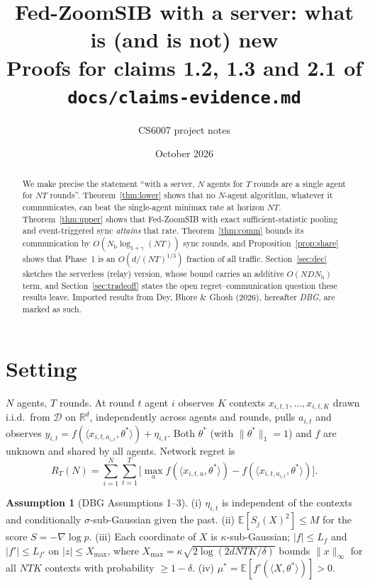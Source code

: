 \documentclass[11pt]{article}
\title{Fed-ZoomSIB with a server: what is (and is not) new\\[2pt]
\large Proofs for claims 1.2, 1.3 and 2.1 of \texttt{docs/claims-evidence.md}}
\author{CS6007 project notes}
\date{October 2026}
\theoremstyle{definition}
\newtheorem{assumption}{Assumption}
\newcommand{\E}{\mathbb{E}}
\newcommand{\R}{\mathbb{R}}
\newcommand{\Nb}{N_{\mathrm b}}
\newcommand{\Xmax}{X_{\max}}
\begin{document}
\maketitle

\begin{abstract}
We make precise the statement ``with a server, $N$ agents for $T$ rounds are a single agent for
$NT$ rounds''. Theorem~\ref{thm:lower} shows that no $N$-agent algorithm, whatever it
communicates, can beat the single-agent minimax rate at horizon $NT$. Theorem~\ref{thm:upper}
shows that Fed-ZoomSIB with exact sufficient-statistic pooling and event-triggered sync
\emph{attains} that rate. Theorem~\ref{thm:comm} bounds its communication by
$O(\Nb\log_{1+\gamma}(NT))$ sync rounds, and Proposition~\ref{prop:share} shows that Phase~1 is an
$O(d/(NT)^{1/3})$ fraction of all traffic. Section~\ref{sec:dec} sketches the serverless
(relay) version, whose bound carries an additive $O(N D \Nb)$ term, and
Section~\ref{sec:tradeoff} states the open regret--communication question these results leave.
Imported results from Dey, Bhore \& Ghosh (2026), hereafter \emph{DBG}, are marked as such.
\end{abstract}

\section{Setting}

$N$ agents, $T$ rounds. At round $t$ agent $i$ observes $K$ contexts $x_{i,t,1},\dots,x_{i,t,K}$
drawn i.i.d.\ from $\mathcal D$ on $\R^d$, independently across agents and rounds, pulls
$a_{i,t}$ and observes $y_{i,t}=f(\langle x_{i,t,a_{i,t}},\theta^*\rangle)+\eta_{i,t}$. Both
$\theta^*$ (with $\|\theta^*\|_1=1$) and $f$ are unknown and shared by all agents. Network regret is
\[
R_T(N)=\sum_{i=1}^N\sum_{t=1}^T\Big[\max_{a} f(\langle x_{i,t,a},\theta^*\rangle)-f(\langle x_{i,t,a_{i,t}},\theta^*\rangle)\Big].
\]

\begin{assumption}[DBG Assumptions 1--3]\label{ass}
(i) $\eta_{i,t}$ is independent of the contexts and conditionally $\sigma$-sub-Gaussian given the
past. (ii) $\E[S_j(X)^2]\le M$ for the score $S=-\nabla\log p$. (iii) Each coordinate of $X$ is
$\kappa$-sub-Gaussian; $|f|\le L_f$ and $|f'|\le L_{f'}$ on $|z|\le\Xmax$, where
$\Xmax=\kappa\sqrt{2\log(2dNTK/\delta)}$ bounds $\|x\|_\infty$ for all $NTK$ contexts with
probability $\ge1-\delta$. (iv) $\mu^*=\E[f'(\langle X,\theta^*\rangle)]>0$.
\end{assumption}
\end{document}
